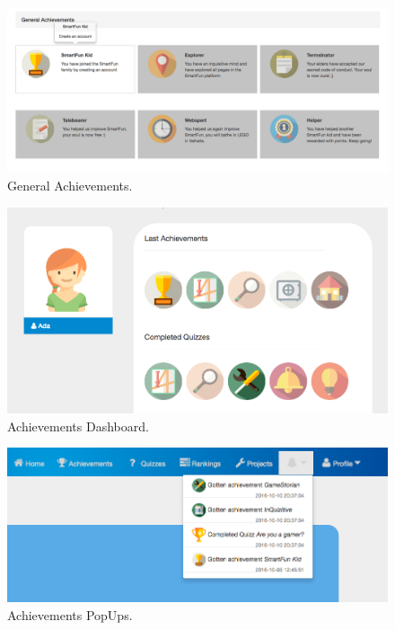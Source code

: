 \begin{figure}
\includegraphics[width=1\linewidth]{images/ui/GeneralAchievements.png}
\caption{General Achievements.}
\label{fig:GeneralAchievements}
\end{figure}

\begin{figure}
\includegraphics[width=1\linewidth]{images/ui/AchievementsDashboard.png}
\caption{Achievements Dashboard.}
\label{fig:AchievementsDashboard}
\end{figure}

\begin{figure}
\includegraphics[width=1\linewidth]{images/ui/AchievementsPopUps.png}
\caption{Achievements PopUps.}
\label{fig:AchievementsPopUps}
\end{figure}


